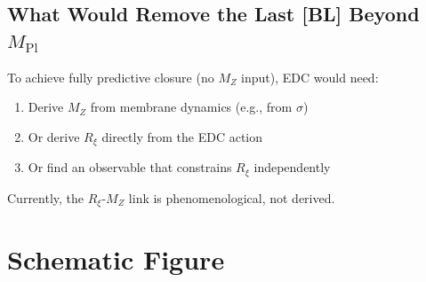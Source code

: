 \documentclass[11pt,a4paper]{article}
\newcommand{\Mpl}{M_{\text{Pl}}}
\newcommand{\MZ}{M_Z}
\newcommand{\Rxi}{R_\xi}
\begin{document}
\subsection{What Would Remove the Last [BL] Beyond $\Mpl$}

To achieve fully predictive closure (no $\MZ$ input), EDC would need:
\begin{enumerate}
    \item Derive $\MZ$ from membrane dynamics (e.g., from $\sigma$)
    \item Or derive $\Rxi$ directly from the EDC action
    \item Or find an observable that constrains $\Rxi$ independently
\end{enumerate}

Currently, the $\Rxi$-$\MZ$ link is phenomenological, not derived.

\section{Schematic Figure}
\label{sec:figure}
\end{document}
